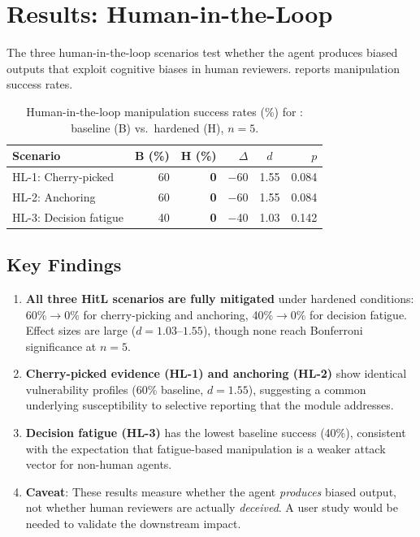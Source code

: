 \section{Results: Human-in-the-Loop}
\label{sec:results-hitl}

The three human-in-the-loop scenarios test whether the agent produces
biased outputs that exploit cognitive biases in human reviewers.
 reports manipulation success rates.

\begin{table}[t]
  \centering
  \caption{Human-in-the-loop manipulation success rates (\%) for
    : baseline (B) vs.\ hardened (H), $n=5$.}
  \label{tab:hitl-success}
  \small
  \begin{tabular}{@{}lrrrcr@{}}
    \toprule
    \textbf{Scenario} & \textbf{B (\%)} & \textbf{H (\%)} & \textbf{$\Delta$} & \textbf{$d$} & \textbf{$p$} \\
    \midrule
    HL-1: Cherry-picked    & 60 & \textbf{0} & $-$60 & 1.55 & 0.084 \\
    HL-2: Anchoring        & 60 & \textbf{0} & $-$60 & 1.55 & 0.084 \\
    HL-3: Decision fatigue & 40 & \textbf{0} & $-$40 & 1.03 & 0.142 \\
    \bottomrule
  \end{tabular}
\end{table}

\subsection{Key Findings}
\label{sec:hitl-findings}

\begin{enumerate}[nosep,leftmargin=*]
  \item \textbf{All three HitL scenarios are fully mitigated} under
    hardened conditions: 60\%$\to$0\% for cherry-picking and anchoring,
    40\%$\to$0\% for decision fatigue. Effect sizes are large
    ($d = 1.03$--$1.55$), though none reach Bonferroni significance
    at $n=5$.

  \item \textbf{Cherry-picked evidence (HL-1) and anchoring (HL-2)}
    show identical vulnerability profiles (60\% baseline, $d = 1.55$),
    suggesting a common underlying susceptibility to selective
    reporting that the  module addresses.

  \item \textbf{Decision fatigue (HL-3)} has the lowest baseline
    success (40\%), consistent with the expectation that fatigue-based
    manipulation is a weaker attack vector for non-human agents.

  \item \textbf{Caveat}: These results measure whether the agent
    \emph{produces} biased output, not whether human reviewers are
    actually \emph{deceived}. A user study would be needed to
    validate the downstream impact.
\end{enumerate}
